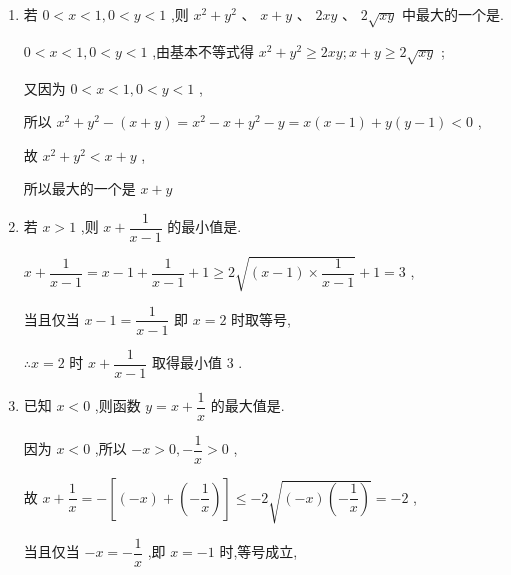 \begin{enumerate}
\begin{jieda}
        对于,,显然 $a < 0,b < 0$ 时,不等式均不成立,即和错误；

        对于,因为 ${ab} > 0$ ,所以 $\dfrac{b}{a} > 0,\dfrac{a}{b} > 0$ ,由基本不等式可得 $\dfrac{b}{a} + \dfrac{a}{b} \geq  2\sqrt{\dfrac{b}{a} \cdot  \dfrac{a}{b}} = 2$ ,当且仅当 $a = b$ 成立即正确;

        对于，当$a=b=-1$时不等式不成立，故错误
    \end{jieda}
    \item  若 $0 < x < 1,0 < y < 1$ ,则 ${x}^{2} + {y}^{2}\text{ 、 }x + y\text{ 、 }{2xy}\text{ 、 }2\sqrt{xy}$ 中最大的一个是.
    \begin{jieda}
        $0 < x < 1,0 < y < 1$ ,由基本不等式得 ${x}^{2} + {y}^{2} \geq  {2xy};x + y \geq  2\sqrt{xy}$ ;
        
        又因为 $0 < x < 1,0 < y < 1$ ,
        
        所以 ${x}^{2} + {y}^{2} - \left( {x + y}\right)  = {x}^{2} - x + {y}^{2} - y = x\left( {x - 1}\right)  + y\left( {y - 1}\right)  < 0$ ,
        
        故 ${x}^{2} + {y}^{2} < x + y$ ,
        
        所以最大的一个是 $x + y$
    \end{jieda}
    \item 若 $x > 1$ ,则 $x + \dfrac{1}{x - 1}$ 的最小值是.
    \begin{jieda}
        $x + \dfrac{1}{x - 1} = x - 1 + \dfrac{1}{x - 1} + 1 \geq  2\sqrt{\left( {x - 1}\right)  \times  \dfrac{1}{x - 1}} + 1 = 3$ ,
        
        当且仅当 $x - 1 = \dfrac{1}{x - 1}$ 即 $x = 2$ 时取等号,
        
        $\therefore x = 2$ 时 $x + \dfrac{1}{x - 1}$ 取得最小值 3 .
    \end{jieda}
    \item 已知 $x < 0$ ,则函数 ${y} = {x} + \dfrac{1}{{x}}$ 的最大值是.
    \begin{jieda}
        因为 $x < 0$ ,所以 $- x > 0, - \dfrac{1}{x} > 0$ ,
        
        故 $x + \dfrac{1}{x} =  - \left\lbrack  {\left( {-x}\right)  + \left( {-\dfrac{1}{x}}\right) }\right\rbrack   \leq   - 2\sqrt{\left( {-x}\right) \left( {-\dfrac{1}{x}}\right) } =  - 2$ ,
        
        当且仅当 $- x =  - \dfrac{1}{x}$ ,即 $x =  - 1$ 时,等号成立,
        

\end{jieda}
\end{enumerate}
